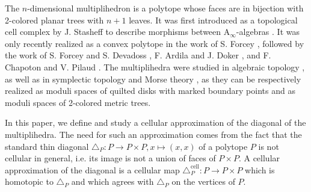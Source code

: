 \documentclass[10pt]{amsart}
\theoremstyle{remark}
\begin{document}
The $n$-dimensional multiplihedron is a polytope whose faces are in bijection with 2-colored planar trees with $n+1$ leaves. It was first introduced as a topological cell complex by J. Stasheff to describe morphisms between $\mathrm{A}_\infty$-algebras \cite{Stasheff70}.
It was only recently realized as a convex polytope in the work of S. Forcey \cite{Forcey08}, followed by the work of S. Forcey and S. Devadoss \cite{DevadossForcey08}, F. Ardila and J. Doker \cite{AD13}, and F. Chapoton and V. Pilaud \cite{CP22}.
The multiplihedra were studied in algebraic topology \cite{BoardmanVogt73}, as well as in symplectic topology \cite{MauWoodward10,mau-wehrheim-woodward} and Morse theory \cite{mazuir-I,mazuir-II}, as they can be respectively realized as moduli spaces of quilted disks with marked boundary points and as moduli spaces of 2-colored metric trees. 

In this paper, we define and study a cellular approximation of the diagonal of the multiplihedra. 
The need for such an approximation comes from the fact that the standard thin diagonal $\triangle_P:P\to P\times P, x\mapsto (x,x)$ of a polytope $P$ is not cellular in general, i.e. its image is not a union of faces of $P\times P$. 
A cellular approximation of the diagonal is a cellular map $\triangle_P^{\textrm{cell}} : P \to P\times P$ which is homotopic to $\triangle_P$ and which agrees with $\triangle_P$ on the vertices of $P$.
\end{document}
